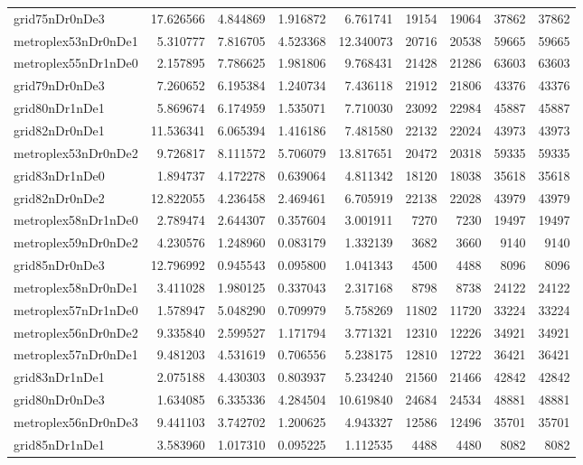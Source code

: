 \begin{longtable}{|l|r|r|r|r|r|r|r|r|}
grid75nDr0nDe3 & 17.626566 & 4.844869 & 1.916872 & 6.761741 & 19154 & 19064 & 37862 & 37862 \\
metroplex53nDr0nDe1 & 5.310777 & 7.816705 & 4.523368 & 12.340073 & 20716 & 20538 & 59665 & 59665 \\
metroplex55nDr1nDe0 & 2.157895 & 7.786625 & 1.981806 & 9.768431 & 21428 & 21286 & 63603 & 63603 \\
grid79nDr0nDe3 & 7.260652 & 6.195384 & 1.240734 & 7.436118 & 21912 & 21806 & 43376 & 43376 \\
grid80nDr1nDe1 & 5.869674 & 6.174959 & 1.535071 & 7.710030 & 23092 & 22984 & 45887 & 45887 \\
grid82nDr0nDe1 & 11.536341 & 6.065394 & 1.416186 & 7.481580 & 22132 & 22024 & 43973 & 43973 \\
metroplex53nDr0nDe2 & 9.726817 & 8.111572 & 5.706079 & 13.817651 & 20472 & 20318 & 59335 & 59335 \\
grid83nDr1nDe0 & 1.894737 & 4.172278 & 0.639064 & 4.811342 & 18120 & 18038 & 35618 & 35618 \\
grid82nDr0nDe2 & 12.822055 & 4.236458 & 2.469461 & 6.705919 & 22138 & 22028 & 43979 & 43979 \\
metroplex58nDr1nDe0 & 2.789474 & 2.644307 & 0.357604 & 3.001911 & 7270 & 7230 & 19497 & 19497 \\
metroplex59nDr0nDe2 & 4.230576 & 1.248960 & 0.083179 & 1.332139 & 3682 & 3660 & 9140 & 9140 \\
grid85nDr0nDe3 & 12.796992 & 0.945543 & 0.095800 & 1.041343 & 4500 & 4488 & 8096 & 8096 \\
metroplex58nDr0nDe1 & 3.411028 & 1.980125 & 0.337043 & 2.317168 & 8798 & 8738 & 24122 & 24122 \\
metroplex57nDr1nDe0 & 1.578947 & 5.048290 & 0.709979 & 5.758269 & 11802 & 11720 & 33224 & 33224 \\
metroplex56nDr0nDe2 & 9.335840 & 2.599527 & 1.171794 & 3.771321 & 12310 & 12226 & 34921 & 34921 \\
metroplex57nDr0nDe1 & 9.481203 & 4.531619 & 0.706556 & 5.238175 & 12810 & 12722 & 36421 & 36421 \\
grid83nDr1nDe1 & 2.075188 & 4.430303 & 0.803937 & 5.234240 & 21560 & 21466 & 42842 & 42842 \\
grid80nDr0nDe3 & 1.634085 & 6.335336 & 4.284504 & 10.619840 & 24684 & 24534 & 48881 & 48881 \\
metroplex56nDr0nDe3 & 9.441103 & 3.742702 & 1.200625 & 4.943327 & 12586 & 12496 & 35701 & 35701 \\
grid85nDr1nDe1 & 3.583960 & 1.017310 & 0.095225 & 1.112535 & 4488 & 4480 & 8082 & 8082 \\

\end{longtable}
